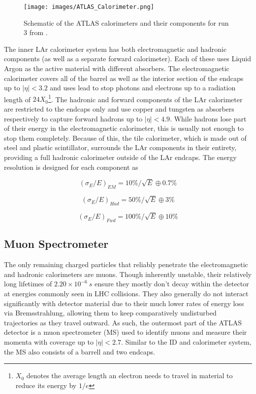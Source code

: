\begin{figure}
\centering
    \texttt{[image: images/ATLAS\_Calorimeter.png]}
    \caption{Schematic of the ATLAS calorimeters and their components for run 3 from \cite{atlas-run3-setup}.}
    \label{fig:ATLAS_Calorimeter}
\end{figure}

The inner LAr calorimeter system has both electromagnetic and hadronic components (as well as a separate forward 
calorimeter). Each of these uses Liquid Argon as the active material with different absorbers. The electromagnetic 
calorimeter covers all of the barrel as well as the interior section of the endcaps up to $|\eta| < 3.2$ and uses lead 
to stop photons and electrons up to a radiation length of $24X_0$\footnote{$X_0$ denotes the average length an electron 
needs to travel in material to reduce its energy by $1/e$}. The hadronic and forward components of the LAr calorimeter are 
restricted to the endcaps only and use copper and tungsten as absorbers respectively to capture forward hadrons up to 
$|\eta| < 4.9$. While hadrons lose part of their energy in the electromagnetic calorimeter, this is usually not enough 
to stop them completely. Because of this, the tile calorimeter, which is made out of steel and plastic scintillator, 
surrounds the LAr components in their entirety, providing a full hadronic calorimeter outside of the LAr endcaps. The 
energy resolution is designed for each component as

\begin{equation} %
(\sigma_{E}/E)_{EM} = 10\% / \sqrt{E} \oplus 0.7\%
\end{equation}

\begin{equation} %
(\sigma_{E}/E)_{Had} = 50\% / \sqrt{E} \oplus 3\%
\end{equation}

\begin{equation} %
(\sigma_{E}/E)_{Fwd} = 100\% / \sqrt{E} \oplus 10\%
\end{equation}

\subsection{Muon Spectrometer}

The only remaining charged particles that reliably penetrate the electromagnetic and hadronic calorimeters are muons. 
Though inherently unstable, their relatively long lifetimes of $2.20\times10^{-6}\ s$ ensure they mostly don't decay 
within the detector at energies commonly seen in LHC collisions. They also generally do not interact significantly 
with detector material due to their much lower rates of energy loss via Bremsstrahlung, allowing them to keep 
comparatively undisturbed trajectories as they travel outward. As such, the outermost part of the ATLAS detector is a 
muon spectrometer (MS) used to identify muons and measure their momenta with coverage up to $|\eta| < 2.7$. Similar to 
the ID and calorimeter system, the MS also consists of a barrell and two endcaps. \par

